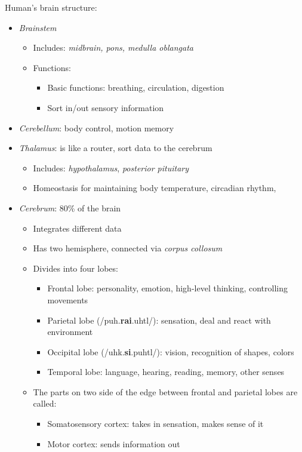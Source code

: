 Human's brain structure:
\begin{itemize}
	\item \textit{Brainstem}
	\begin{itemize}
		\item Includes: \textit{midbrain, pons, medulla oblangata}
		\item Functions:
		\begin{itemize}
			\item Basic functions: breathing, circulation, digestion
			\item Sort in/out sensory information
		\end{itemize}
	\end{itemize}
	\item \textit{Cerebellum}: body control, motion memory
	\item \textit{Thalamus}: is like a router, sort data to the cerebrum
	\begin{itemize}
		\item Includes: \textit{hypothalamus}, \textit{posterior pituitary}
		\item Homeostasis for maintaining body temperature, circadian rhythm, \etc
	\end{itemize}
	\item \textit{Cerebrum}: 80\% of the brain
	\begin{itemize}
		\item Integrates different data
		\item Has two hemisphere, connected via \textit{corpus collosum}
		\item Divides into four lobes:
		\begin{itemize}
			\item Frontal lobe: personality, emotion, high-level thinking, controlling movements
			\item Parietal lobe (/puh.\textbf{rai}.uhtl/): sensation, deal and react with environment
			\item Occipital lobe (/uhk.\textbf{si}.puhtl/): vision, recognition of shapes, colors
			\item Temporal lobe: language, hearing, reading, memory, other senses
		\end{itemize}
		\item The parts on two side of the edge between frontal and parietal lobes are called:
		\begin{itemize}
			\item Somatosensory cortex: takes in sensation, makes sense of it
			\item Motor cortex: sends information out
		\end{itemize}
	\end{itemize}
\end{itemize}

